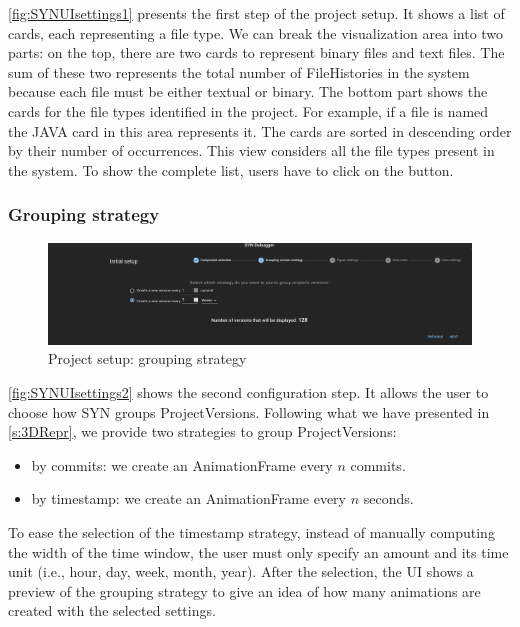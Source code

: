 \autoref{fig:SYNUIsettings1} presents the first step of the project setup. It shows a list of cards, each representing a file type. 
We can break the visualization area into two parts: on the top, there are two cards to represent binary files and text files. 
The sum of these two represents the total number of FileHistories in the system because each file must be either textual or binary. 
The bottom part shows the cards for the file types identified in the project. For example, if a file is named  the JAVA card in this area represents it. 
The cards are sorted in descending order by their number of occurrences. This view considers all the file types present in the system. To show the complete list, users have to click on the  button.

\subsubsection*{Grouping strategy}

\begin{figure} [h]
    \center
    \includegraphics[width=\textwidth]{SYNUI-settings2.png}
    \caption{Project setup: grouping strategy}
    \label{fig:SYNUIsettings2}
\end{figure}

\autoref{fig:SYNUIsettings2} shows the second configuration step. It allows the user to choose how SYN groups ProjectVersions. 
Following what we have presented in \autoref{s:3DRepr}, we provide two strategies to group ProjectVersions:
\begin{itemize}
    \item by commits: we create an AnimationFrame every $n$ commits. 
    \item by timestamp: we create an AnimationFrame every $n$ seconds. 
\end{itemize}

To ease the selection of the timestamp strategy, instead of manually computing the width of the time window, the user must only specify an amount and its time unit (i.e., hour, day, week, month, year). After the selection, the UI shows a preview of the grouping strategy to give an idea of how many animations are created with the selected settings. 

